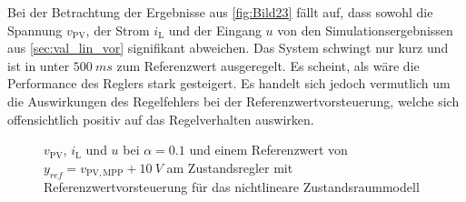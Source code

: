 Bei der Betrachtung der Ergebnisse aus \autoref{fig:Bild23} fällt auf, dass sowohl die Spannung $v_{\mathrm{PV}}$, der Strom $i_{\mathrm{L}}$ und der Eingang $u$ von den Simulationsergebnissen aus \autoref{sec:val_lin_vor} signifikant abweichen. Das System schwingt nur kurz und ist in unter $\SI{500}{ms}$ zum Referenzwert ausgeregelt. Es scheint, als wäre die Performance des Reglers stark gesteigert. Es handelt sich jedoch vermutlich um die Auswirkungen des Regelfehlers bei der Referenzwertvorsteuerung, welche sich offensichtlich positiv auf das Regelverhalten auswirken.

\begin{figure}[H]
    \centering
    \caption[Validierung Regler mit Vorsteuerung (nichtlinear)]{$v_{\mathrm{PV}}$, $i_{\mathrm{L}}$ und $u$ bei $\alpha = 0.1$ und einem Referenzwert von $y_{ref} = v_{\mathrm{PV,MPP}} + \SI{10}{V}$ am Zustandsregler mit Referenzwertvorsteuerung für das nichtlineare Zustandsraummodell}
    \label{fig:Bild23}
\end{figure}

